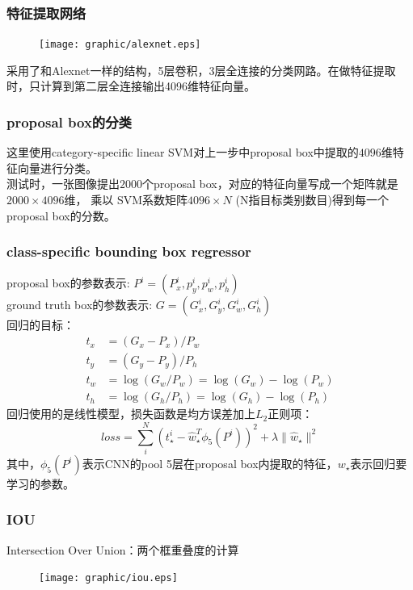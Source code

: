 \documentclass{beamer}
\begin{document}
\begin{frame}
    \frametitle{特征提取网络}
    \begin{figure}
        \centering
        \texttt{[image: graphic/alexnet.eps]}
    \end{figure}
    采用了和Alexnet一样的结构，5层卷积，3层全连接的分类网路。在做特征提取时，只计算到第二层全连接输出4096维特征向量。
\end{frame}

\begin{frame}
    \frametitle{proposal box的分类}
    这里使用category-specific linear SVM对上一步中proposal box中提取的$4096$维特征向量进行分类。 \\
    \vspace{10pt}
    测试时，一张图像提出$2000$个proposal box，对应的特征向量写成一个矩阵就是$2000\times 4096$维， 乘以 SVM系数矩阵$4096\times N$ (N指目标类别数目)得到每一个proposal box的分数。%
\end{frame}

\begin{frame}
    \frametitle{class-specific bounding box regressor}
    proposal box的参数表示: $P^i=(P_x^i,p_y^i,p_w^i,p_h^i)$ \\
    ground truth box的参数表示: $G=(G_x^i,G_y^i,G_w^i,G_h^i)$ \\
    回归的目标： \\
    $$\begin{aligned} 
        t_x &= (G_x-P_x)/P_w \\
        t_y &= (G_y-P_y)/P_h \\
        t_w &= \log(G_w/P_w)=\log(G_w)-\log(P_w) \\
        t_h &= \log(G_h/P_h)=\log(G_h)-\log(P_h)
    \end{aligned}$$
    \vspace{6pt}
    回归使用的是线性模型，损失函数是均方误差加上$L_2$正则项： 
    $$loss=\sum_i^N (t_{\star}^i-\hat w_{\star}^T \phi_5(P^i))^2+\lambda\|\hat w_{\star}\|^2$$
    \scriptsize{其中，$\phi_5(P^i)$表示CNN的pool 5层在proposal box内提取的特征，$w_{\star}$表示回归要学习的参数。}
\end{frame}

\begin{frame}
    \frametitle{IOU}
    Intersection Over Union：两个框重叠度的计算 \\
    \begin{figure}
        \centering
        \texttt{[image: graphic/iou.eps]}
    \end{figure}
\end{frame}
\end{document}
